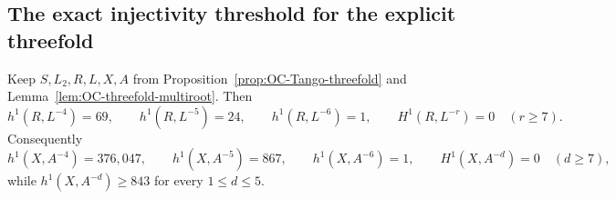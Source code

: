 
\subsection{The exact injectivity threshold for the explicit threefold}

\begin{lemma}
\label{lem:OC-threefold-negative-degrees}
Keep $S,L_2,R,L,X,A$ from
Proposition~\ref{prop:OC-Tango-threefold} and
Lemma~\ref{lem:OC-threefold-multiroot}.  Then
\[
 h^1(R,L^{-4})=69,\qquad h^1(R,L^{-5})=24,\qquad
 h^1(R,L^{-6})=1,\qquad H^1(R,L^{-r})=0\quad(r\geq7).
\]
Consequently
\[
 h^1(X,A^{-4})=376{,}047,\qquad h^1(X,A^{-5})=867,
 \qquad h^1(X,A^{-6})=1,
 \qquad H^1(X,A^{-d})=0\quad(d\geq7),
\]
while $h^1(X,A^{-d})\geq843$ for every $1\leq d\leq5$.
\end{lemma}
